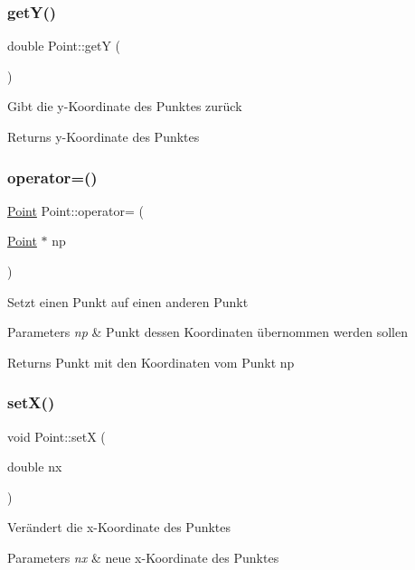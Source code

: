 \subsubsection{\texorpdfstring{get\+Y()}{getY()}}
{\footnotesize\ttfamily double Point\+::getY (\begin{DoxyParamCaption}{ }\end{DoxyParamCaption})}

Gibt die y-\/\+Koordinate des Punktes zurück \begin{DoxyReturn}{Returns}
y-\/\+Koordinate des Punktes 
\end{DoxyReturn}
\mbox{\label{class_point_a4fabca990b4e246773cada554b22ff5d}} 
\subsubsection{\texorpdfstring{operator=()}{operator=()}}
{\footnotesize\ttfamily \mbox{\hyperlink{class_point}{Point}} Point\+::operator= (\begin{DoxyParamCaption}\item[{\mbox{\hyperlink{class_point}{Point}} $\ast$}]{np }\end{DoxyParamCaption})}

Setzt einen Punkt auf einen anderen Punkt 
\begin{DoxyParams}{Parameters}
{\em np} & Punkt dessen Koordinaten übernommen werden sollen \\
\hline
\end{DoxyParams}
\begin{DoxyReturn}{Returns}
Punkt mit den Koordinaten vom Punkt np 
\end{DoxyReturn}
\mbox{\label{class_point_a62436e2678bfd0a4be0e2729c9d60380}} 
\subsubsection{\texorpdfstring{set\+X()}{setX()}}
{\footnotesize\ttfamily void Point\+::setX (\begin{DoxyParamCaption}\item[{double}]{nx }\end{DoxyParamCaption})}

Verändert die x-\/\+Koordinate des Punktes 
\begin{DoxyParams}{Parameters}
{\em nx} & neue x-\/\+Koordinate des Punktes \\
\hline
\end{DoxyParams}
\mbox{\label{class_point_a3611975b72fc2279dc91653237bd3cd5}} 
